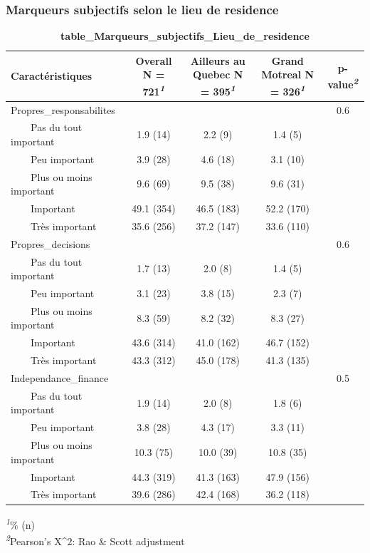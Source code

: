 \documentclass[
]{article}
\begin{document}
\hypertarget{marqueurs-subjectifs-selon-le-lieu-de-residence}{%
\subsubsection{Marqueurs subjectifs selon le lieu de
residence}\label{marqueurs-subjectifs-selon-le-lieu-de-residence}}

\begin{table}[!t]
\caption{\label{tab:unnamed-chunk-82}\textbf{table\_Marqueurs\_subjectifs\_Lieu\_de\_residence}} 
\fontsize{12.0pt}{14.4pt}\selectfont
\begin{tabular*}{\linewidth}{@{\extracolsep{\fill}}lcccc}
\toprule
\textbf{Caractéristiques} & \textbf{Overall}  N = 721\textsuperscript{\textit{1}} & \textbf{Ailleurs au Quebec}  N = 395\textsuperscript{\textit{1}} & \textbf{Grand Motreal}  N = 326\textsuperscript{\textit{1}} & \textbf{p-value}\textsuperscript{\textit{2}} \\ 
\midrule\addlinespace[2.5pt]
Propres\_responsabilites &  &  &  & 0.6 \\ 
    Pas du tout important & 1.9 (14) & 2.2 (9) & 1.4 (5) &  \\ 
    Peu important & 3.9 (28) & 4.6 (18) & 3.1 (10) &  \\ 
    Plus ou moins important & 9.6 (69) & 9.5 (38) & 9.6 (31) &  \\ 
    Important & 49.1 (354) & 46.5 (183) & 52.2 (170) &  \\ 
    Très important & 35.6 (256) & 37.2 (147) & 33.6 (110) &  \\ 
Propres\_decisions &  &  &  & 0.6 \\ 
    Pas du tout important & 1.7 (13) & 2.0 (8) & 1.4 (5) &  \\ 
    Peu important & 3.1 (23) & 3.8 (15) & 2.3 (7) &  \\ 
    Plus ou moins important & 8.3 (59) & 8.2 (32) & 8.3 (27) &  \\ 
    Important & 43.6 (314) & 41.0 (162) & 46.7 (152) &  \\ 
    Très important & 43.3 (312) & 45.0 (178) & 41.3 (135) &  \\ 
Independance\_finance &  &  &  & 0.5 \\ 
    Pas du tout important & 1.9 (14) & 2.0 (8) & 1.8 (6) &  \\ 
    Peu important & 3.8 (28) & 4.3 (17) & 3.3 (11) &  \\ 
    Plus ou moins important & 10.3 (75) & 10.0 (39) & 10.8 (35) &  \\ 
    Important & 44.3 (319) & 41.3 (163) & 47.9 (156) &  \\ 
    Très important & 39.6 (286) & 42.4 (168) & 36.2 (118) &  \\ 
\bottomrule
\end{tabular*}
\begin{minipage}{\linewidth}
\textsuperscript{\textit{1}}\% (n)\\
\textsuperscript{\textit{2}}Pearson's X\^{}2: Rao \& Scott adjustment\\
\end{minipage}
\end{table}
\end{document}
